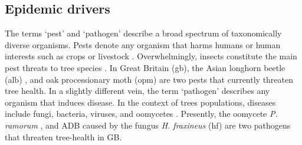 

\subsection{Epidemic drivers}


The terms `pest' and `pathogen' describe a broad spectrum of taxonomically diverse organisms. 
Pests denote any organism that harms humans or human interests such as crops or livestock
\cite{buckle2015rodent, oerke2006crop, de1964biological}. Overwhelmingly, insects constitute the main
pest threats to tree species \cite{metcalf1994introduction}. In Great Britain (\acrshort{gb}), the Asian longhorn beetle
(\acrshort{alb}) \cite{haack2010managing}, and oak processionary moth (\acrshort{opm}) \cite{tomlinson2015managing} are two pests that currently threaten tree health.
In a slightly different vein, the term `pathogen' describes any organism that induces disease. 
In the context of trees populations, diseases include fungi, bacteria, viruses, and oomycetes \cite{balloux2017q, Boyd1235773}.
Presently, the oomycete \textit{P. ramorum} \cite{brasier2005phytophthora}, and ADB
caused by the fungus \textit{H. fraxineus} (\acrshort{hf}) \cite{ash-dieback-costs, mitchell2014ash} are two pathogens
that threaten tree-health in GB.

